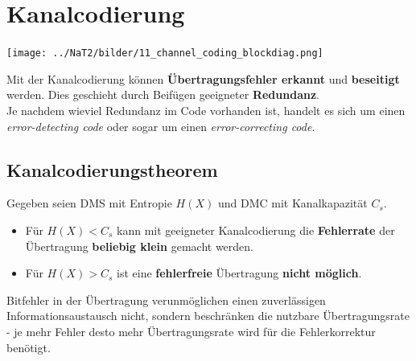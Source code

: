\section{Kanalcodierung } 
\begin{center}
	\texttt{[image: ../NaT2/bilder/11\_channel\_coding\_blockdiag.png]}
\end{center}

Mit der Kanalcodierung können \textbf{Übertragungsfehler erkannt} und \textbf{beseitigt} werden.
Dies geschieht durch Beifügen geeigneter \textbf{Redundanz}. \\
Je nachdem wieviel Redundanz im Code vorhanden ist, handelt es sich um einen \textit{error-detecting
code} oder sogar um einen \textit{error-correcting code}.

\subsection{Kanalcodierungstheorem }
Gegeben seien DMS mit Entropie $H(X)$ und DMC mit Kanalkapazität $C_s$. 

\begin{itemize}
  	\item Für $H(X) < C_s$ kann mit geeigneter Kanalcodierung die \textbf{Fehlerrate} der
  	Übertragung \textbf{beliebig klein} gemacht werden. 
	\item Für $H(X) > C_s$ ist eine \textbf{fehlerfreie} Übertragung \textbf{nicht möglich}.
\end{itemize}
Bitfehler in der Übertragung verunmöglichen einen zuverlässigen Informationsaustausch nicht,
sondern beschränken die nutzbare Übertragungsrate - je mehr Fehler desto mehr Übertragungsrate
wird für die Fehlerkorrektur benötigt. \\

